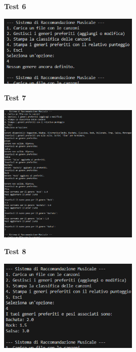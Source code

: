 \documentclass[a4paper,11pt]{article}
\begin{document}
\newpage
\begin{center}
    \textbf{Test 6}
    \par
    \vspace{0.5cm}
    \includegraphics[width=0.5\textwidth]{htest6}
\end{center}
\begin{center}
    \textbf{Test 7}
    \par
    \vspace{0.5cm}
    \includegraphics[width=0.5\textwidth]{htest7}
\end{center}
\begin{center}
    \textbf{Test 8}
    \par
    \vspace{0.5cm}
    \includegraphics[width=0.5\textwidth]{htest8}
\end{center}
\end{document}
